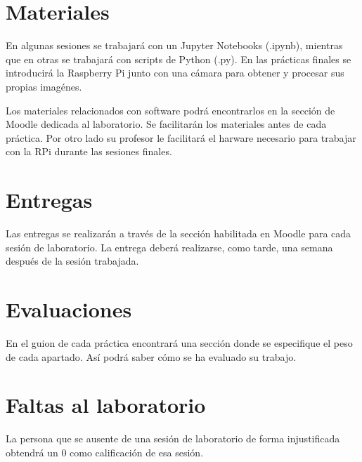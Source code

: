 \section{Materiales}
En algunas sesiones se trabajará con un Jupyter Notebooks (.ipynb), mientras que en otras se trabajará con scripts de Python (.py). En las prácticas finales se introducirá la Raspberry Pi junto con una cámara para obtener y procesar sus propias imagénes.

Los materiales relacionados con software podrá encontrarlos en la sección de Moodle dedicada al laboratorio. Se facilitarán los materiales antes de cada práctica. Por otro lado su profesor le facilitará el harware necesario para trabajar con la RPi durante las sesiones finales.

\section{Entregas}
Las entregas se realizarán a través de la sección habilitada en Moodle para cada sesión de laboratorio. La entrega deberá realizarse, como tarde, una semana después de la sesión trabajada.

\section{Evaluaciones}
En el guion de cada práctica encontrará una sección donde se especifique el peso de cada apartado. Así podrá saber cómo se ha evaluado su trabajo.

\section{Faltas al laboratorio}
La persona que se ausente de una sesión de laboratorio de forma injustificada obtendrá un 0 como calificación de esa sesión.